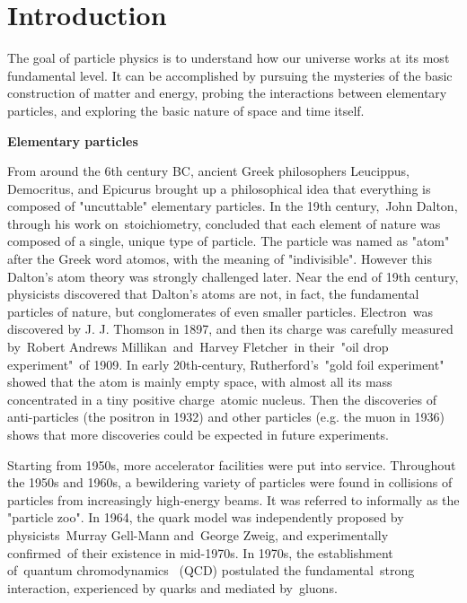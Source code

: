 
\chapter{Introduction}

The goal of particle physics is to understand how our universe works at its most fundamental level. It can be accomplished by pursuing the mysteries of the basic construction of matter and energy, probing the interactions between elementary particles, and exploring the basic nature of space and time itself. 

\textbf{Elementary particles}

From around the 6th century BC, ancient Greek philosophers Leucippus, Democritus, and Epicurus brought up a philosophical idea that everything is composed of "uncuttable" elementary particles. In the 19th century, John Dalton, through his work on stoichiometry, concluded that each element of nature was composed of a single, unique type of particle. The particle was named as "atom" after the Greek word atomos, with the meaning of "indivisible". However this Dalton's atom theory was strongly challenged later. Near the end of 19th century, physicists discovered that Dalton's atoms are not, in fact, the fundamental particles of nature, but conglomerates of even smaller particles. Electron was discovered by J. J. Thomson in 1897, and then its charge was carefully measured by Robert Andrews Millikan and Harvey Fletcher in their "oil drop experiment" of 1909. In early 20th-century, Rutherford's "gold foil experiment" showed that the atom is mainly empty space, with almost all its mass concentrated in a tiny positive charge atomic nucleus. Then the discoveries of anti-particles (the positron in 1932) and other particles (e.g. the muon in 1936) shows that more discoveries could be expected in future experiments.

Starting from 1950s, more accelerator facilities were put into service. Throughout the 1950s and 1960s, a bewildering variety of particles were found in collisions of particles from increasingly high-energy beams. It was referred to informally as the "particle zoo".
In 1964, the quark model was independently proposed by physicists Murray Gell-Mann and George Zweig, and experimentally confirmed of their existence in mid-1970s. In 1970s, the establishment of quantum chromodynamics  (QCD) postulated the fundamental strong interaction, experienced by quarks and mediated by gluons.


